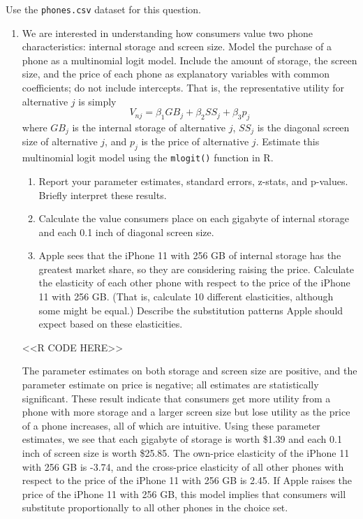 \documentclass[11pt,letterpaper]{article}
\begin{document}
Use the \texttt{phones.csv} dataset for this question.

\begin{enumerate}[label=\alph*., leftmargin=*]
	\item We are interested in understanding how consumers value two phone characteristics: internal storage and screen size. Model the purchase of a phone as a multinomial logit model. Include the amount of storage, the screen size, and the price of each phone as explanatory variables with common coefficients; do not include intercepts. That is, the representative utility for alternative $j$ is simply
	$$V_{nj} = \beta_1 GB_j + \beta_2 SS_j + \beta_3 p_j$$
	where $GB_j$ is the internal storage of alternative $j$, $SS_j$ is the diagonal screen size of alternative $j$, and $p_j$ is the price of alternative $j$. Estimate this multinomial logit model using the \texttt{mlogit()} function in R. 
	\begin{enumerate}[label=\roman*.]
		\item Report your parameter estimates, standard errors, z-stats, and p-values. Briefly interpret these results. 
		\item Calculate the value consumers place on each gigabyte of internal storage and each 0.1 inch of diagonal screen size.
		\item Apple sees that the iPhone 11 with 256 GB of internal storage has the greatest market share, so they are considering raising the price. Calculate the elasticity of each other phone with respect to the price of the iPhone 11 with 256 GB. (That is, calculate 10 different elasticities, although some might be equal.) Describe the substitution patterns Apple should expect based on these elasticities.
	\end{enumerate}

	<<R CODE HERE>>

	The parameter estimates on both storage and screen size are positive, and the parameter estimate on price is negative; all estimates are statistically significant. These result indicate that consumers get more utility from a phone with more storage and a larger screen size but lose utility as the price of a phone increases, all of which are intuitive. Using these parameter estimates, we see that each gigabyte of storage is worth \$1.39 and each 0.1 inch of screen size is worth \$25.85. The own-price elasticity of the iPhone 11 with 256 GB is -3.74, and the cross-price elasticity of all other phones with respect to the price of the iPhone 11 with 256 GB is 2.45. If Apple raises the price of the iPhone 11 with 256 GB, this model implies that consumers will substitute proportionally to all other phones in the choice set.


\end{enumerate}
\end{document}
